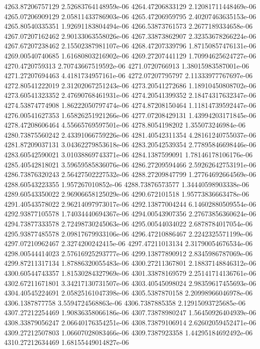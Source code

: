 {4263.87206757129 2.52683764148959e-06
4264.47206833129 2.12081711448469e-06
4265.07206909129 2.05811433786903e-06
4265.47206959795 2.40207463635153e-06
4265.80540335351 1.92691183804494e-06
4266.53873761573 2.2677189334658e-06
4267.07207162462 2.90133063558026e-06
4267.33873862907 2.32353678266224e-06
4267.67207238462 2.15502387981107e-06
4268.47207339796 1.87150857476131e-06
4269.00540740685 1.61680803216902e-06
4269.27207441129 1.70994625624727e-06
4270.4720759313 2.70743667519592e-06
4271.0720766913 1.38015983587001e-06
4271.27207694463 4.4181734957161e-06
4272.07207795797 2.11333977767697e-06
4272.80541222019 2.31202067251243e-06
4273.20541272686 1.18910450808702e-06
4273.60541323352 2.47690768461931e-06
4274.20541399352 2.18474317632347e-06
4274.53874774908 1.86222050797474e-06
4274.87208150464 1.11814739592447e-06
4276.00541627353 1.65826251921266e-06
4277.07208429131 1.43994203171845e-06
4278.47208606464 4.55665769597501e-06
4278.8054198202 1.355073246984e-06
4280.73875560242 2.43391066759226e-06
4281.40542311354 4.28161240755037e-06
4281.87209037131 3.04362279853618e-06
4283.20542539354 2.77895846698446e-06
4283.60542590021 3.01038869743371e-06
4284.1387599091 1.78146178106176e-06
4285.40542818021 3.59659585836076e-06
4286.27209594466 2.59262642753191e-06
4286.73876320243 2.56427502227532e-06
4288.27209847799 1.27764692664569e-06
4288.60543223355 1.957267010852e-06
4288.73876573577 1.34440598903338e-06
4289.60543350022 2.96906658125029e-06
4290.672101518 1.95773836663478e-06
4291.40543578022 2.96214097973017e-06
4292.13877004244 6.14602880509554e-06
4292.93877105578 1.74034440694367e-06
4294.00543907356 2.27673856360624e-06
4294.73877333578 2.72498730245063e-06
4295.00544034022 2.6878784017054e-06
4295.93877485578 2.09817679933106e-06
4296.47210886467 2.2242325571199e-06
4297.07210962467 2.3274200242415e-06
4297.47211013134 2.31790054676534e-06
4298.00544414023 2.57616925293777e-06
4299.13877890912 2.8345986787069e-06
4299.87211317134 1.87886320055483e-06
4300.27211367801 2.18837148846312e-06
4300.60544743357 1.81530284327969e-06
4301.33878169579 2.25141714136761e-06
4302.67211671801 3.34217130731507e-06
4303.40545098024 2.98359617455693e-06
4304.40545224691 2.05825161047398e-06
4305.5387870158 2.20998966046978e-06
4306.1387877758 3.5594724568863e-06
4306.7387885358 2.12915093725685e-06
4307.27212254469 1.90836358066186e-06
4307.73878980247 1.56450926404939e-06
4308.33879056247 2.06640176354251e-06
4308.73879106914 2.62602059452471e-06
4309.27212507803 1.06607028083466e-06
4309.7387923358 1.44295184692492e-06
4310.27212634469 1.68155449014827e-06
}
